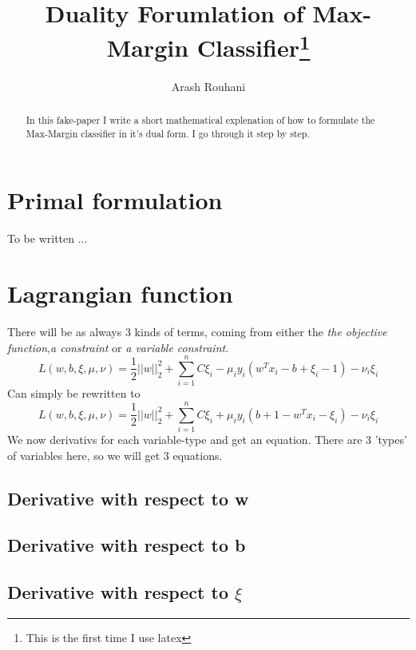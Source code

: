 \documentclass[a4paper,11pt]{article}
\title{Duality Forumlation of Max-Margin Classifier\footnote{This is the first time I use latex}}
\author{Arash Rouhani}
\begin{document}
\maketitle

\begin{abstract}
In this fake-paper I write a short mathematical explenation
of how to formulate the Max-Margin classifier in it's dual form.
I go through it step by step. 

\end{abstract}

\section{Primal formulation}
To be written ...
\section{Lagrangian function}
There will be as always 3 kinds of terms, coming from either the \textit{the objective function},\textit{a constraint} or \textit{a variable constraint}.
\begin{equation}
L(w, b, \xi, \mu, \nu) = \frac{1}{2} ||w||^2_2 + \sum\limits_{i=1}^n {C\xi_i - \mu_iy_i(w^Tx_i - b + \xi_i - 1) - \nu_i\xi_i}
\end{equation}
Can simply be rewritten to
\begin{equation}
L(w, b, \xi, \mu, \nu) = \frac{1}{2} ||w||^2_2 + \sum\limits_{i=1}^n {C\xi_i + \mu_iy_i(b + 1 - w^Tx_i - \xi_i) - \nu_i\xi_i}
\end{equation}
We now derivativs for each variable-type and get an equation. There are 3 'types' of variables here, so we will get 3 equations.
\subsection{Derivative with respect to w}
  
\subsection{Derivative with respect to b}
\subsection{Derivative with respect to $\xi$}
\end{document}

